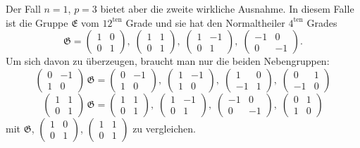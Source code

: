 \documentclass[12pt,a4paper]{article}
\begin{document}
Der Fall $n = 1$, $p = 3$ bietet aber die zweite wirkliche Ausnahme. In diesem Falle ist die Gruppe $\mathfrak{E}$ vom $12^{\text{ten}}$ Grade und sie hat den Normaltheiler $4^{\text{ten}}$ Grades
\[
\mathfrak{G} =
\begin{pmatrix}1&0\\0&1\end{pmatrix},\;
\begin{pmatrix}1&1\\0&1\end{pmatrix},\;
\begin{pmatrix}1&-1\\0&1\end{pmatrix},\;
\begin{pmatrix}-1&0\\0&-1\end{pmatrix}.
\]
Um sich davon zu überzeugen, braucht man nur die beiden Nebengruppen:
\[
\begin{pmatrix}0&-1\\1&0\end{pmatrix}\,\mathfrak{G}
= \begin{pmatrix}0&-1\\1&0\end{pmatrix},\;
\begin{pmatrix}1&-1\\1&0\end{pmatrix},\;
\begin{pmatrix}1&0\\-1&1\end{pmatrix},\;
\begin{pmatrix}0&1\\-1&0\end{pmatrix}
\]
\[
\begin{pmatrix}1&1\\0&1\end{pmatrix}\,\mathfrak{G}
= \begin{pmatrix}1&1\\0&1\end{pmatrix},\;
\begin{pmatrix}1&-1\\0&1\end{pmatrix},\;
\begin{pmatrix}-1&0\\0&-1\end{pmatrix},\;
\begin{pmatrix}0&1\\1&0\end{pmatrix}
\]
mit $\mathfrak{G}$, $\begin{pmatrix}1&0\\0&1\end{pmatrix}$, $\begin{pmatrix}1&1\\0&1\end{pmatrix}$ zu vergleichen.
\end{document}
